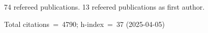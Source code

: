 74 refereed publications. 13 refeered publications as first author.

Total citations~=~4790; h-index~=~37 (2025-04-05)